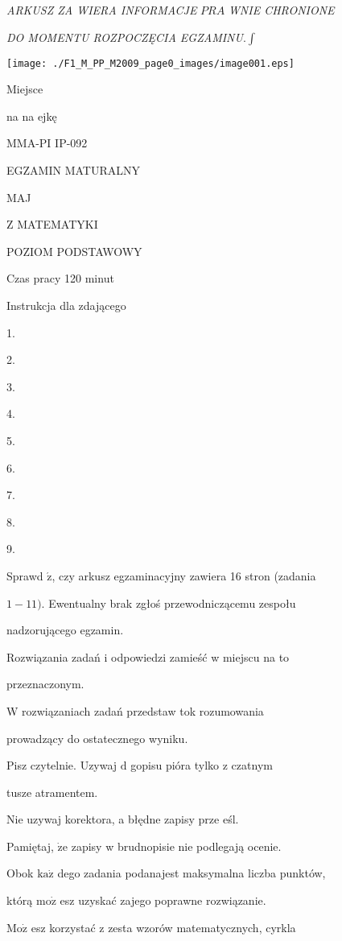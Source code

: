 \documentclass[a4paper,12pt]{article}
\begin{document}
{\it ARKUSZ ZA WIERA INFORMACJE} $PRA$ {\it WNIE CHRONIONE}

{\it DO MOMENTU ROZPOCZĘCIA EGZAMINU}.$\displaystyle \int$
\begin{center}
\texttt{[image: ./F1\_M\_PP\_M2009\_page0\_images/image001.eps]}
\end{center}
Miejsce

na na ejkę

MMA-PI IP-092

EGZAMIN MATURALNY

MAJ

Z MATEMATYKI

POZIOM PODSTAWOWY

Czas pracy 120 minut

Instrukcja dla zdającego

1.

2.

3.

4.

5.

6.

7.

8.

9.

Sprawd $\acute{\mathrm{z}}$, czy arkusz egzaminacyjny zawiera 16 stron (zadania

$1-11)$. Ewentualny brak zgłoś przewodniczącemu zespołu

nadzorującego egzamin.

Rozwiązania zadań i odpowiedzi zamieść w miejscu na to

przeznaczonym.

W rozwiązaniach zadań przedstaw tok rozumowania

prowadzący do ostatecznego wyniku.

Pisz czytelnie. Uzywaj $\mathrm{d}$ gopisu pióra tylko z czatnym

tusze atramentem.

Nie uzywaj korektora, a błędne zapisy prze eśl.

Pamiętaj, $\dot{\mathrm{z}}\mathrm{e}$ zapisy w brudnopisie nie podlegają ocenie.

Obok $\mathrm{k}\mathrm{a}\dot{\mathrm{z}}$ dego zadania podanajest maksymalna liczba punktów,

którą $\mathrm{m}\mathrm{o}\dot{\mathrm{z}}$ esz uzyskać zajego poprawne rozwiązanie.

$\mathrm{M}\mathrm{o}\dot{\mathrm{z}}$ esz korzystać z zesta wzorów matematycznych, cyrkla
\end{document}
